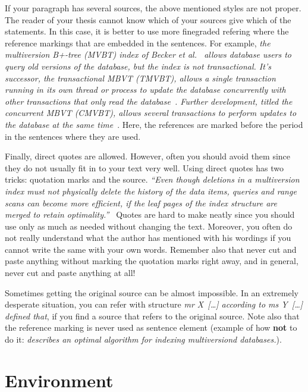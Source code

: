 \documentclass[12pt,a4paper,oneside,pdftex]{report}
\begin{document}
If your paragraph has several sources, the above mentioned styles are
not proper. The reader of your thesis cannot know which of your
sources give which of the statements. In this case, it is better to
use more finegraded refering where the reference markings that are
embedded in the sentences. For example, \emph{the multiversion B+-tree
  (MVBT) index of Becker et al.~\cite{becker:1996:mvbt} allows database
  users to query old versions of the database, but the index is not
  transactional.
  It's successor, the transactional MBVT (TMVBT), allows a single transaction
  running in its own thread or process to update the database concurrently
  with other transactions that only read the
  database~\cite{haapasalo:2009:tmvbt}.
  Further development, titled the concurrent MBVT (CMVBT),
  allows several transactions to perform updates to the database at the same
  time~\cite{HaapasaloThesis}}.
  Here, the references are marked before
  the period in the sentences where they are used.

Finally, direct quotes are allowed. However, often you should avoid
them since they do not usually fit in to your text very well. Using
direct quotes has two tricks: quotation marks and the source.  \emph{
  ``Even though deletions in a multiversion index must not physically
  delete the history of the data items, queries and range scans can
  become more efficient, if the leaf pages of the index structure are
  merged to retain optimality.''~\cite{HaapasaloThesis}} Quotes are
hard to make neatly since you should use only as much as needed
without changing the text. Moreover, you often do not really
understand what the author has mentioned with his wordings if you
cannot write the same with your own words. Remember also that never
cut and paste anything without marking the quotation marks right away,
and in general, never cut and paste anything at all!

Sometimes getting the original source can be almost impossible. In an
extremely desperate situation, you can refer with structure \emph{mr
  X~[\ldots] according to ms Y~[\ldots] defined that}, if you find a
source that refers to the original source. Note also that the
reference marking is never used as sentence element (example of how
\textbf{not} to do it: \emph{\cite{HaapasaloThesis} describes
an optimal algorithm for indexing multiversiond databases.}).



% 

\chapter{Environment}
\label{chapter:environment}
\end{document}
